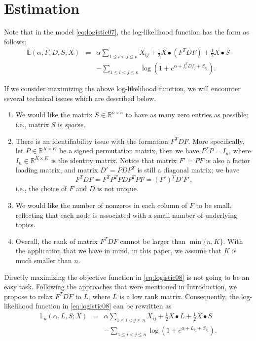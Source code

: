 \documentclass{article}
\begin{document}
\section{Estimation}
\label{sec:estimate}


Note that in the model \eqref{eq:logistic07}, the log-likelihood function has the form as follows:
\begin{eqnarray}
\label{eq:logistic08}
\mathbb{L}(\alpha,  F, D, S; X)
&=& \alpha \sum_{1\le i< j\le n}X_{ij} +\frac{1}{2} X \bullet (F^T D F) +\frac{1}{2} X \bullet S \\
&& -\sum_{1\le i<j\le n} \log \left(1 + e^{\alpha + f_i^T D f_j +S_{ij} }\right). \nonumber
\end{eqnarray}

If we consider maximizing the above log-likelihood function,
we will encounter several technical issues which are described below.
\begin{enumerate}
\item We would like the matrix $S \in \mathbb{R}^{n \times n}$ to have as many zero entries as possible; i.e., matrix $S$ is {\it sparse.}

\item There is an identifiability issue with the formation $F^T D F$.
More specifically, let $P \in \mathbb{R}^{K \times K}$ be a signed permutation matrix, then we have $P^T P = I_n$, where $I_n \in \mathbb{R}^{K \times K}$ is the identity matrix.
Notice that matrix $F' = PF$ is also a factor loading matrix, and
matrix $D' = P D P^T$ is still a diagonal matrix;
we have
$$
F^T D F = F^T P^T P D P^T P F = (F')^T D' F',
$$
i.e., the choice of $F$ and $D$ is not unique.

\item We would like the number of nonzeros in each column of $F$ to be small, reflecting that each node is associated with a small number of underlying topics.

\item Overall, the rank of matrix $F^T D F$ cannot be larger than $\min\{n,K\}$.
With the application that we have in mind, in this paper, we assume that $K$ is much smaller than $n$.

\end{enumerate}


Directly maximizing the objective function in \eqref{eq:logistic08} is not going to be an easy task.
Following the approaches that were mentioned in Introduction, we propose to relax $F^T D F$ to $L$, where $L$ is a low rank matrix.
Consequently, the log-likelihood function in \eqref{eq:logistic08} can be rewritten as
\begin{eqnarray}
\label{eq:logistic09}
\mathbb{L}_n(\alpha,  L, S; X)
&=& \alpha \sum_{1\le i< j\le n}X_{ij} +\frac{1}{2} X \bullet L +\frac{1}{2} X \bullet S \\
&& -\sum_{1\le i<j\le n} \log \left(1 + e^{\alpha + L_{ij} +S_{ij}}\right). \nonumber
\end{eqnarray}
\end{document}
